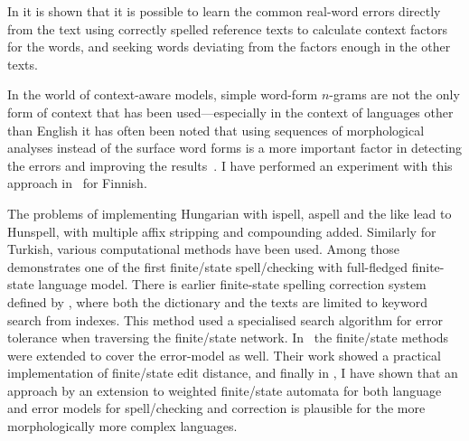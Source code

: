 \documentclass[officiallayout]{unihelcompling}
\begin{document}
In \citet{al2006learning} it is shown that it is possible to learn the common
real-word errors directly from the text using correctly spelled reference texts
to calculate context factors for the words, and seeking words deviating from
the factors enough in the other texts.

In the world of context-aware models, simple word-form \(n\)-grams are not the
only form of context that has been used---especially in the context of
languages other than English it has often been noted that using sequences of
morphological analyses instead of the surface word forms is a more important
factor in detecting the errors and improving the results~\citet[for
Spanish]{otero2007contextual}. I have performed an experiment with this
approach in~ for Finnish.

The problems of implementing Hungarian with ispell, aspell and the like lead to
Hunspell, with multiple affix stripping and compounding added. Similarly for
Turkish, various computational methods have been used. Among
those~\citet{oflazer1996errortolerant} demonstrates one of the first
finite\-/state spell\-/checking with full-fledged finite-state language
model. There is earlier finite-state spelling correction system
defined by \citet{aho1975efficient}, where both the dictionary and the texts
are limited to keyword search from indexes.
This method used a specialised search algorithm for error tolerance when
traversing the finite\-/state network.  In~\citet{agata2002typographical} the
finite\-/state methods were extended to cover the error-model as well. Their work
showed a practical implementation of finite\-/state edit distance, and finally in
, I have shown that an approach by an
extension to weighted finite\-/state automata for both language and error models
for spell\-/checking and correction is plausible for the more morphologically
more complex languages.


\end{document}
